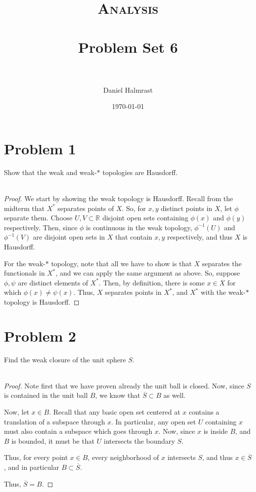\documentclass[fontsize=11pt]{scrartcl} %
\title{	
\normalfont \normalsize 
\textsc{Analysis} \\ [25pt] %
\horrule{0.5pt} \\[0.4cm] %
\huge Problem Set 6 \\ %
\horrule{2pt} \\[0.5cm] %
}
\author{Daniel Halmrast} %
\date{\normalsize\today} %
\numberwithin{equation}{section} %
\numberwithin{figure}{section} %
\numberwithin{table}{section} %
\newcommand{\R}{\mathbb{R}}
\begin{document}
\maketitle %

\section*{Problem 1}
Show that the weak and weak-$*$ topologies are Hausdorff.
\\
\\
\begin{proof}
    We start by showing the weak topology is Hausdorff. Recall from the midterm
    that $X^*$ separates points of $X$. So, for $x,y$ distinct points in $X$,
    let $\phi$ separate them. Choose $U,V\subset \R$ disjoint open sets
    containing $\phi(x)$ and $\phi(y)$ respectively. Then, since $\phi$ is
    continuous in the weak topology, $\phi^{-1}(U)$ and $\phi^{-1}(V)$ are
    disjoint open sets in $X$ that contain $x,y$ respectively, and thus $X$ is
    Hausdorff.

    For the weak-$*$ topology, note that all we have to show is that $X$
    separates the functionals in $X^*$, and we can apply the same argument as
    above. So, suppose $\phi,\psi$ are distinct elements of $X^*$. Then, by
    definition, there is some $x\in X$ for which $\phi(x)\neq \psi(x)$. Thus,
    $X$ separates points in $X^*$, and $X^*$ with the weak-$*$ topology is
    Hausdorff.
\end{proof}

\newpage

\section*{Problem 2}
Find the weak closure of the unit sphere $S$.
\\
\\
\begin{proof}
    Note first that we have proven already the unit ball is closed. Now, since
    $S$ is contained in the unit ball $B$, we know that $\overline{S}\subset B$
    as well.

    Now, let $x\in B$. Recall that any basic open set centered at $x$ contains a
    translation of a subspace through $x$. In particular, any open set $U$
    containing $x$ must also contain a subspace which goes through $x$. Now,
    since $x$ is inside $B$, and $B$ is bounded, it must be that $U$ intersects
    the boundary $S$. 

    Thus, for every point $x\in B$, every neighborhood of $x$ intersects $S$,
    and thus $x\in\overline{S}$, and in particular $B\subset\overline{S}$.

    Thus, $\overline{S} = B$.
\end{proof}
\end{document}
